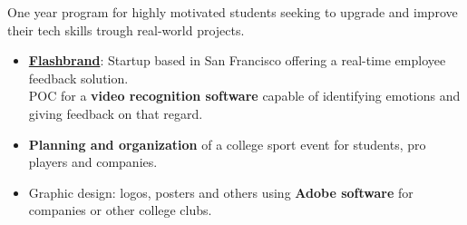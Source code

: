 \documentclass[10pt,a4paper,ragged2e]{altacv}
\begin{document}
One year program for highly motivated students seeking to upgrade and improve their tech skills trough real-world projects.
\smallskip
\begin{itemize}
	\item \href{https://flashbrand.me/}{\textbf{Flashbrand}}: Startup based in San Francisco offering a real-time employee feedback solution. \\POC for a \textbf{video recognition software} capable of identifying emotions and giving feedback on that regard.
\end{itemize}
\divider
{}
\begin{itemize}
	\item \textbf{Planning and organization} of a college sport event for students, pro players and companies.
\end{itemize}
\divider
{}
\begin{itemize}
	\item Graphic design: logos, posters and others using \textbf{Adobe software} for companies or other college clubs.
\end{itemize}



\end{document}
